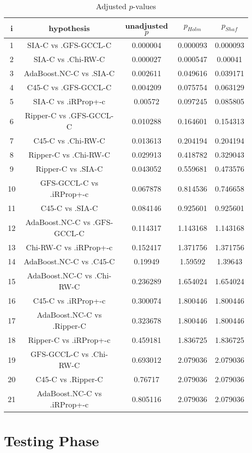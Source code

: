 \documentclass[a4paper,10pt]{article}
\begin{document}
\begin{table}[!htp]
\scriptsize\centering
\caption{Adjusted $p$-values}
\begin{tabular}{ccccc}
i&hypothesis&unadjusted $p$&$p_{Holm}$&$p_{Shaf}$\\
\hline1&SIA-C vs .GFS-GCCL-C&0.000004&0.000093&0.000093\\
2&SIA-C vs .Chi-RW-C&0.000027&0.000547&0.00041\\
3&AdaBoost.NC-C vs .SIA-C&0.002611&0.049616&0.039171\\
4&C45-C vs .GFS-GCCL-C&0.004209&0.075754&0.063129\\
5&SIA-C vs .iRProp+-c&0.00572&0.097245&0.085805\\
6&Ripper-C vs .GFS-GCCL-C&0.010288&0.164601&0.154313\\
7&C45-C vs .Chi-RW-C&0.013613&0.204194&0.204194\\
8&Ripper-C vs .Chi-RW-C&0.029913&0.418782&0.329043\\
9&Ripper-C vs .SIA-C&0.043052&0.559681&0.473576\\
10&GFS-GCCL-C vs .iRProp+-c&0.067878&0.814536&0.746658\\
11&C45-C vs .SIA-C&0.084146&0.925601&0.925601\\
12&AdaBoost.NC-C vs .GFS-GCCL-C&0.114317&1.143168&1.143168\\
13&Chi-RW-C vs .iRProp+-c&0.152417&1.371756&1.371756\\
14&AdaBoost.NC-C vs .C45-C&0.19949&1.59592&1.39643\\
15&AdaBoost.NC-C vs .Chi-RW-C&0.236289&1.654024&1.654024\\
16&C45-C vs .iRProp+-c&0.300074&1.800446&1.800446\\
17&AdaBoost.NC-C vs .Ripper-C&0.323678&1.800446&1.800446\\
18&Ripper-C vs .iRProp+-c&0.459181&1.836725&1.836725\\
19&GFS-GCCL-C vs .Chi-RW-C&0.693012&2.079036&2.079036\\
20&C45-C vs .Ripper-C&0.76717&2.079036&2.079036\\
21&AdaBoost.NC-C vs .iRProp+-c&0.805116&2.079036&2.079036\\
\hline
\end{tabular}
\end{table}
\flushleft
\pagebreak



\section{Testing Phase}
\end{document}
